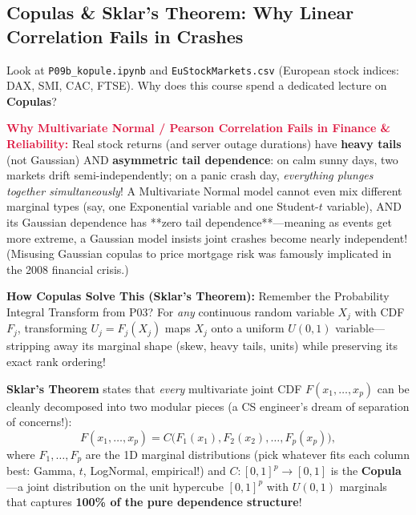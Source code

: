 \documentclass[11pt, a4paper]{article}
\begin{document}
\subsection{Copulas \& Sklar's Theorem: Why Linear Correlation Fails in Crashes}
Look at \texttt{P09b\_kopule.ipynb} and \texttt{EuStockMarkets.csv} (European stock indices: DAX, SMI, CAC, FTSE). Why does this course spend a dedicated lecture on \textbf{Copulas}?

\textcolor{crimson}{\textbf{Why Multivariate Normal / Pearson Correlation Fails in Finance \& Reliability:}}
Real stock returns (and server outage durations) have \textbf{heavy tails} (not Gaussian) AND \textbf{asymmetric tail dependence}: on calm sunny days, two markets drift semi-independently; on a panic crash day, \emph{everything plunges together simultaneously}! A Multivariate Normal model cannot even mix different marginal types (say, one Exponential variable and one Student-$t$ variable), AND its Gaussian dependence has **zero tail dependence**---meaning as events get more extreme, a Gaussian model insists joint crashes become nearly independent! (Misusing Gaussian copulas to price mortgage risk was famously implicated in the 2008 financial crisis.)

\textbf{How Copulas Solve This (Sklar's Theorem):}
Remember the Probability Integral Transform from P03? For \emph{any} continuous random variable $X_j$ with CDF $F_j$, transforming $U_j = F_j(X_j)$ maps $X_j$ onto a uniform $U(0,1)$ variable---stripping away its marginal shape (skew, heavy tails, units) while preserving its exact rank ordering!

\textbf{Sklar's Theorem} states that \emph{every} multivariate joint CDF $F(x_1, \dots, x_p)$ can be cleanly decomposed into two modular pieces (a CS engineer's dream of separation of concerns!):
\[
    F(x_1, \dots, x_p) = C\big(F_1(x_1), F_2(x_2), \dots, F_p(x_p)\big),
\]
where $F_1, \dots, F_p$ are the 1D marginal distributions (pick whatever fits each column best: Gamma, $t$, LogNormal, empirical!) and $C: [0,1]^p \to [0,1]$ is the \textbf{Copula}---a joint distribution on the unit hypercube $[0,1]^p$ with $U(0,1)$ marginals that captures \textbf{100\% of the pure dependence structure}!
\end{document}
